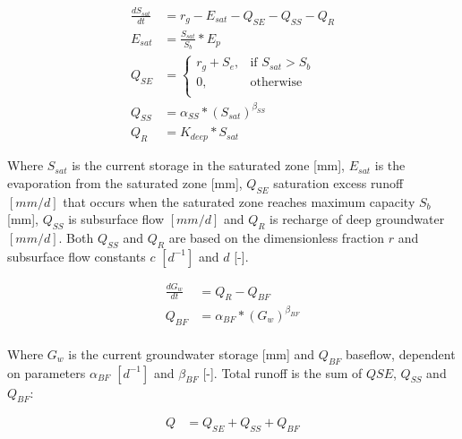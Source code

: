 \begin{align}
	\frac{dS_{sat}}{dt} &= r_g - E_{sat} - Q_{SE} - Q_{SS} - Q_{R}\\
	E_{sat} &= \frac{S_{sat}}{S_b}*E_p\\
	Q_{SE} &= \begin{cases}
		r_g+S_e, &\text{if } S_{sat} > S_b \\
		0, & \text{otherwise} \\
	\end{cases} \\
	Q_{SS} &= \alpha_{SS}*\left(S_{sat}\right)^{\beta_{SS}}\\
	Q_{R} &= K_{deep}*S_{sat}
\end{align}

Where $S_{sat}$ is the current storage in the saturated zone [mm], $E_{sat}$ is the evaporation from the saturated zone [mm], $Q_{SE}$ saturation excess runoff $[mm/d]$ that occurs when the saturated zone reaches maximum capacity $S_b$ [mm], $Q_{SS}$ is subsurface flow $[mm/d]$ and $Q_R$ is recharge of deep groundwater $[mm/d]$. Both $Q_{SS}$ and $Q_R$ are based on the dimensionless fraction $r$ and subsurface flow constants $c$ $[d^{-1}]$ and $d$ [-]. 

\begin{align}
	\frac{dG_w}{dt} &= Q_{R} - Q_{BF}\\
	Q_{BF} &= \alpha_{BF}*\left(G_w\right)^{\beta_{BF}}\\
\end{align}

Where $G_w$ is the current groundwater storage [mm] and $Q_{BF}$ baseflow, dependent on parameters  $\alpha_{BF}$ $[d^{-1}]$ and $\beta_{BF}$ [-]. Total runoff is the sum of $Q{SE}$, $Q_{SS}$ and $Q_{BF}$:

\begin{align}
	Q &= Q_{SE} + Q_{SS} + Q_{BF}
\end{align}

\newpage
